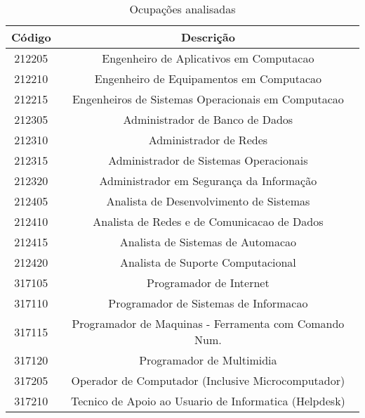 \begin{table}[htbp]
	\caption{Ocupações analisadas}
	\begin{center}
		\begin{tabular}{|c|c|}
			\hline
			\textbf{Código} & \textbf{Descrição}                                  \\ 
			\hline
			212205           & Engenheiro de Aplicativos em Computacao               \\
			212210           & Engenheiro de Equipamentos em Computacao              \\
			212215           & Engenheiros de Sistemas Operacionais em Computacao    \\
			\hline 										
			212305           & Administrador de Banco de Dados                       \\
			212310           & Administrador de Redes                                \\
			212315           & Administrador de Sistemas Operacionais                \\
			212320           & Administrador em Segurança da Informação           \\
			\hline 									
			212405           & Analista de Desenvolvimento de Sistemas               \\
			212410           & Analista de Redes e de Comunicacao de Dados           \\
			212415           & Analista de Sistemas de Automacao                     \\
			212420           & Analista de Suporte Computacional                     \\
			\hline 									
			317105           & Programador de Internet                               \\
			317110           & Programador de Sistemas de Informacao                 \\
			317115           & Programador de Maquinas - Ferramenta com Comando Num. \\
			317120           & Programador de Multimidia                             \\
			\hline 									
			317205           & Operador de Computador (Inclusive Microcomputador)    \\
			317210           & Tecnico de Apoio ao Usuario de Informatica (Helpdesk) \\
			\hline
		\end{tabular}
		\label{ocupacoes}
	\end{center}
\end{table}

